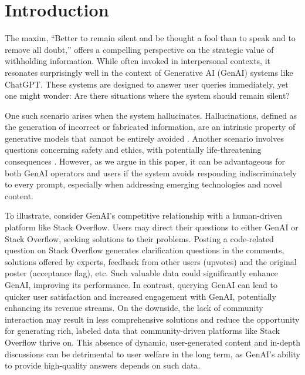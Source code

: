 \section{Introduction}
The maxim, ``Better to remain silent and be thought a fool than to speak and to remove all doubt,'' offers a compelling perspective on the strategic value of withholding information. While often invoked in interpersonal contexts, it resonates surprisingly well in the context of Generative AI (GenAI) systems like ChatGPT. These systems are designed to answer user queries immediately, yet one might wonder: Are there situations where the system should remain silent?



One such scenario arises when the system hallucinates. Hallucinations, defined as the generation of incorrect or fabricated information, are an intrinsic property of generative models that cannot be entirely avoided \cite{kalai2024calibrated}. Another scenario involves questions concerning safety and ethics, with potentially life-threatening consequences \cite{Shin2023, MelloGuha2023, li2024inference}. However, as we argue in this paper, it can be advantageous for both GenAI operators and users if the system avoids responding indiscriminately to every prompt, especially when addressing emerging technologies and novel content.


To illustrate, consider GenAI's competitive relationship with a human-driven platform like Stack Overflow. Users may direct their questions to either GenAI or Stack Overflow, seeking solutions to their problems. Posting a code-related question on Stack Overflow generates clarification questions in the comments, solutions offered by experts, feedback from other users (upvotes) and the original poster (acceptance flag), etc. Such valuable data could significantly enhance GenAI,  improving its performance. In contrast, querying GenAI can lead to quicker user satisfaction and increased engagement with GenAI, potentially enhancing its revenue streams. On the downside, the lack of community interaction may result in less comprehensive solutions and reduce the opportunity for generating rich, labeled data that community-driven platforms like Stack Overflow thrive on. This absence of dynamic, user-generated content and in-depth discussions can be detrimental to user welfare in the long term, as GenAI's ability to provide high-quality answers depends on such data. 



